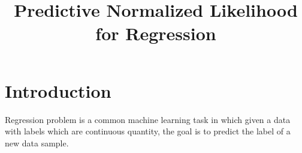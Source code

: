 \documentclass[final,1p,times]{elsarticle}
\begin{document}
\begin{frontmatter}


\title{Predictive Normalized Likelihood for Regression}





\begin{abstract}

\end{abstract}

\begin{keyword}



\end{keyword}

\end{frontmatter}

\linenumbers

\section{Introduction} \label{Introduction}
Regression problem is a common machine learning task in which given a data with labels which are continuous quantity, the goal is to predict the label of a new data sample. 
\end{document}
